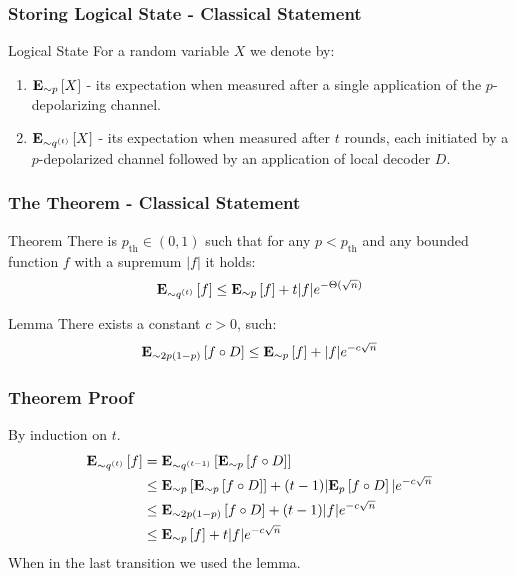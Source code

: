 \documentclass{beamer}
\begin{document}
\begin{frame}
  \frametitle{Storing Logical State - Classical Statement}

  \begin{block}{Logical State}
    For a random variable $X$ we denote by: 
    \begin{enumerate}
      \item $\exppm{X}{ \sim p  }$ - its expectation when measured after a single application of the $p$-depolarizing channel.
      \item $\exppm{X}{ \sim q^{(t)}  }$ - its expectation when measured after $t$ rounds, each initiated by a $p$-depolarized channel followed by an application of local decoder $D$.
    \end{enumerate}
  \end{block}
\end{frame}


\begin{frame}  
  \frametitle{The Theorem - Classical Statement} 
  \begin{block}{Theorem} There is $p_{\text{th}} \in (0,1)$ such that for any $p < p_{\text{th}}$ and any bounded function $f$ with a supremum $|f|$ it holds:
    \begin{equation*}
      \exppm{f}{\sim q^{(t)} }  \le \exppm{ f }{ \sim p  } + t|f| e^{- \Theta( \sqrt{n}) }
    \end{equation*}
\end{block}

\begin{block}{Lemma} There exists a constant $c >0 $, such:
    \begin{equation*}
        \exppm{ f \circ D }{\sim 2p(1-p) } \le \exppm{ f }{\sim p } + |f| e^{- c \sqrt{n} } 
    \end{equation*}
\end{block}
\end{frame}

\begin{frame}
  \frametitle{Theorem Proof}
  By induction on $t$.
  \begin{align*}
    \exppm{f}{\sim q^{(t)} } &=  \exppm{ \exppm{ f \circ D }{\sim p}  }{\sim q^{(t-1)} } \\
      & \le   \exppm{ \exppm{ f \circ D }{\sim p}  }{\sim p } + (t-1)| \exppm{f \circ D}{p}   | e^{- c \sqrt{n} } \\
      & \le   \exppm{ f \circ D }{\sim 2p(1-p) } + (t-1)|f| e^{- c \sqrt{n} } \\
      & \le \exppm{ f }{ \sim p  } + t|f| e^{- c \sqrt{n} }
  \end{align*}
  When in the last transition we used the lemma. 
\end{frame}
\end{document}
